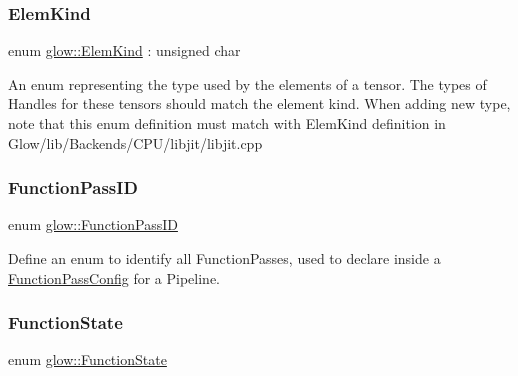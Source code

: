\subsubsection{\texorpdfstring{Elem\+Kind}{ElemKind}}
{\footnotesize\ttfamily enum \hyperlink{namespaceglow_ab92e14a94329daf4083db670e95fbcdf}{glow\+::\+Elem\+Kind} \+: unsigned char\hspace{0.3cm}{\ttfamily [strong]}}

An enum representing the type used by the elements of a tensor. The types of Handles for these tensors should match the element kind. When adding new type, note that this enum definition must match with Elem\+Kind definition in Glow/lib/\+Backends/\+C\+P\+U/libjit/libjit.\+cpp \mbox{\label{namespaceglow_a3157945b92abd634c79fa9d4724472eb}} 
\subsubsection{\texorpdfstring{Function\+Pass\+ID}{FunctionPassID}}
{\footnotesize\ttfamily enum \hyperlink{namespaceglow_a3157945b92abd634c79fa9d4724472eb}{glow\+::\+Function\+Pass\+ID}\hspace{0.3cm}{\ttfamily [strong]}}

Define an enum to identify all Function\+Passes, used to declare inside a \hyperlink{classglow_1_1_function_pass_config}{Function\+Pass\+Config} for a Pipeline. \mbox{\label{namespaceglow_a1c98da7214165b41c7d6b255503d4062}} 
\subsubsection{\texorpdfstring{Function\+State}{FunctionState}}
{\footnotesize\ttfamily enum \hyperlink{namespaceglow_a1c98da7214165b41c7d6b255503d4062}{glow\+::\+Function\+State}\hspace{0.3cm}{\ttfamily [strong]}}

